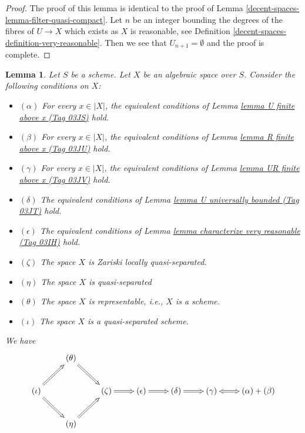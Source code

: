 \documentclass{amsart}
\theoremstyle{plain}
\newtheorem{lemma}[subsection]{Lemma}
\theoremstyle{definition}
\theoremstyle{remark}
\numberwithin{equation}{subsection}
\begin{document}
\begin{proof}
The proof of this lemma is identical to the proof of
Lemma \ref{decent-spaces-lemma-filter-quasi-compact}.
Let $n$ be an integer bounding the degrees of
the fibres of $U \to X$ which exists as $X$ is reasonable, see
Definition \ref{decent-spaces-definition-very-reasonable}.
Then we see that $U_{n + 1} = \emptyset$ and the proof is complete.
\end{proof}


\begin{lemma}
\label{decent-spaces-lemma-bounded-fibres}
Let $S$ be a scheme. Let $X$ be an algebraic space over $S$.
Consider the following conditions on $X$:
\begin{itemize}
\item[] $(\alpha)$ For every $x \in |X|$, the equivalent conditions of
Lemma \href{https://stacks.math.columbia.edu/tag/03JS}{lemma U finite above x (Tag 03JS)}
hold.
\item[] $(\beta)$ For every $x \in |X|$, the equivalent conditions of
Lemma \href{https://stacks.math.columbia.edu/tag/03JU}{lemma R finite above x (Tag 03JU)}
hold.
\item[] $(\gamma)$ For every $x \in |X|$, the equivalent conditions of
Lemma \href{https://stacks.math.columbia.edu/tag/03JV}{lemma UR finite above x (Tag 03JV)}
hold.
\item[] $(\delta)$ The equivalent conditions of
Lemma \href{https://stacks.math.columbia.edu/tag/03JT}{lemma U universally bounded (Tag 03JT)}
hold.
\item[] $(\epsilon)$ The equivalent conditions of
Lemma \href{https://stacks.math.columbia.edu/tag/03IH}{lemma characterize very reasonable (Tag 03IH)}
hold.
\item[] $(\zeta)$ The space $X$ is Zariski locally quasi-separated.
\item[] $(\eta)$ The space $X$ is quasi-separated
\item[] $(\theta)$ The space $X$ is representable, i.e., $X$ is a scheme.
\item[] $(\iota)$ The space $X$ is a quasi-separated scheme.
\end{itemize}
We have
$$
\xymatrix{
& (\theta) \ar@{=>}[rd] & & & &  \\
(\iota) \ar@{=>}[ru] \ar@{=>}[rd] & &
(\zeta) \ar@{=>}[r] &
(\epsilon) \ar@{=>}[r] &
(\delta) \ar@{=>}[r] &
(\gamma) \ar@{<=>}[r] & (\alpha) + (\beta) \\
& (\eta) \ar@{=>}[ru] & & & &
}
$$
\end{lemma}
\end{document}
